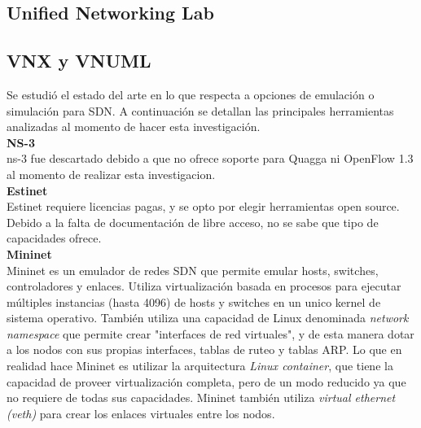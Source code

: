 \subsection{Unified Networking Lab}
\subsection{VNX y VNUML}




Se estudió el estado del arte en lo que respecta a opciones de emulación o simulación para SDN. A continuación se detallan las principales herramientas analizadas al momento de hacer esta investigación.\\

\textbf{NS-3}\\
ns-3 fue descartado debido a que no ofrece soporte para Quagga ni OpenFlow 1.3 al momento de realizar esta investigacion.\\

\textbf{Estinet}\\
Estinet requiere licencias pagas, y se opto por elegir herramientas open source. Debido a la falta de documentación de libre acceso, no se sabe que tipo de capacidades ofrece.\\

\textbf{Mininet}\\
Mininet es un emulador de redes SDN que permite emular hosts, switches, controladores y enlaces. Utiliza virtualización basada en procesos para ejecutar múltiples instancias (hasta 4096) de hosts y switches en un unico kernel de sistema operativo. También utiliza una capacidad de Linux denominada \textit{network namespace} que permite crear "interfaces de red virtuales", y de esta manera dotar a los nodos con sus propias interfaces, tablas de ruteo y tablas ARP. Lo que en realidad hace Mininet es utilizar la arquitectura \textit{Linux container}, que tiene la capacidad de proveer virtualización completa, pero de un modo reducido ya que no requiere de todas sus capacidades. Mininet también utiliza \textit{virtual ethernet (veth)} para crear los enlaces virtuales entre los nodos.

